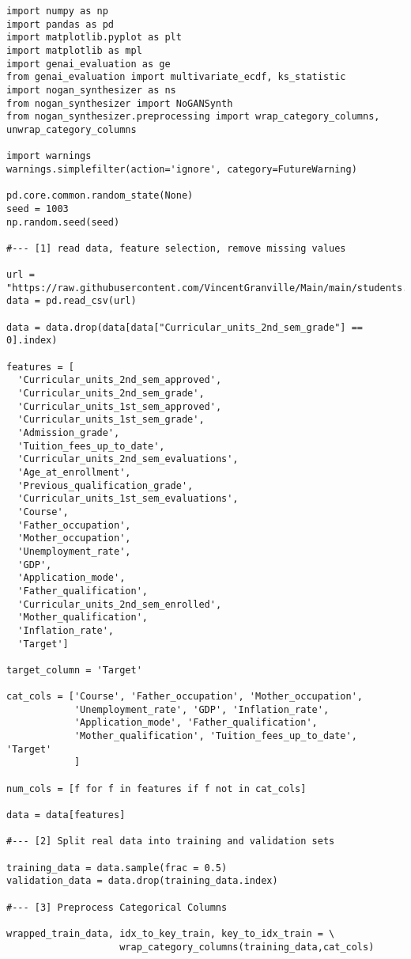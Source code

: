 \documentclass[oneside,10pt]{book}
\begin{document}
\begin{lstlisting}
import numpy as np
import pandas as pd
import matplotlib.pyplot as plt
import matplotlib as mpl
import genai_evaluation as ge
from genai_evaluation import multivariate_ecdf, ks_statistic
import nogan_synthesizer as ns
from nogan_synthesizer import NoGANSynth
from nogan_synthesizer.preprocessing import wrap_category_columns, unwrap_category_columns

import warnings
warnings.simplefilter(action='ignore', category=FutureWarning)

pd.core.common.random_state(None)
seed = 1003
np.random.seed(seed)

#--- [1] read data, feature selection, remove missing values

url = "https://raw.githubusercontent.com/VincentGranville/Main/main/students.csv"
data = pd.read_csv(url)

data = data.drop(data[data["Curricular_units_2nd_sem_grade"] == 0].index)

features = [
  'Curricular_units_2nd_sem_approved',
  'Curricular_units_2nd_sem_grade',
  'Curricular_units_1st_sem_approved',
  'Curricular_units_1st_sem_grade',
  'Admission_grade',
  'Tuition_fees_up_to_date',
  'Curricular_units_2nd_sem_evaluations',
  'Age_at_enrollment',
  'Previous_qualification_grade',
  'Curricular_units_1st_sem_evaluations',
  'Course',
  'Father_occupation',
  'Mother_occupation',
  'Unemployment_rate',
  'GDP',
  'Application_mode',
  'Father_qualification',
  'Curricular_units_2nd_sem_enrolled',
  'Mother_qualification',
  'Inflation_rate',
  'Target']

target_column = 'Target'

cat_cols = ['Course', 'Father_occupation', 'Mother_occupation',
            'Unemployment_rate', 'GDP', 'Inflation_rate',
            'Application_mode', 'Father_qualification',
            'Mother_qualification', 'Tuition_fees_up_to_date', 'Target'
            ]

num_cols = [f for f in features if f not in cat_cols]

data = data[features]

#--- [2] Split real data into training and validation sets

training_data = data.sample(frac = 0.5)
validation_data = data.drop(training_data.index)

#--- [3] Preprocess Categorical Columns

wrapped_train_data, idx_to_key_train, key_to_idx_train = \
                    wrap_category_columns(training_data,cat_cols)


\end{lstlisting}
\end{document}
